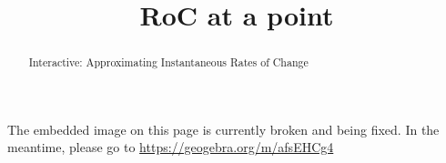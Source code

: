 \documentclass[handout]{ximera}
\title{RoC at a point}
\begin{document}
\begin{abstract} Interactive: Approximating Instantaneous Rates of Change
\end{abstract}

\maketitle

The embedded image on this page is currently broken and being fixed. In the meantime, please go to \url{https://geogebra.org/m/afsEHCg4}

\end{document}
